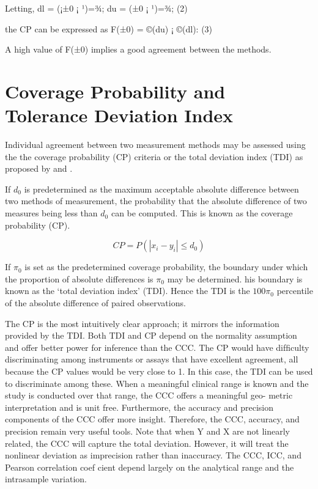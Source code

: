 \documentclass[MAIN.tex]{subfiles}
\begin{document}
Letting,
dl = (¡±0 ¡ ¹)=¾; du = (±0 ¡ ¹)=¾; (2)


the CP can be expressed as
F(±0) = ©(du) ¡ ©(dl): (3)

A high value of F(±0) implies a good agreement between the methods.


\section{Coverage Probability and Tolerance Deviation Index}

Individual agreement between two measurement methods may be
assessed using the the coverage probability (CP) criteria or the
total deviation index (TDI) as proposed by \citet{lin2000} and
\citet{lin2002}.

If $d_{0}$ is predetermined as the maximum acceptable absolute
difference between two methods of measurement, the probability
that the absolute difference of two measures being less than
$d_{0}$ can be computed. This is known as the coverage probability
(CP).

\begin{equation}
CP = P(|x_{i} - y_{i}| \leq d_{0})
\end{equation}

If $\pi_{0}$ is set as the predetermined coverage probability, the
boundary under which the proportion of absolute differences is
$\pi_{0}$ may be determined. his boundary is known as the `total
deviation index' (TDI). Hence the TDI is the $100\pi_{0}$
percentile of the absolute difference of paired observations.


The CP is the most intuitively clear approach; it mirrors the information provided by the TDI. 
Both TDI and CP depend on the normality assumption and offer better power
for inference than the CCC. The CP would have difficulty discriminating among instruments or 
assays that have excellent agreement, all because the CP values would be very close to
1. In this case, the TDI can be used to discriminate among these. When a meaningful clinical range is known and the study is conducted over that range, the CCC offers a meaningful geo- metric interpretation and is unit free. Furthermore, the accuracy and precision components of the CCC offer more insight. Therefore, the CCC, accuracy, and precision remain very useful tools. Note that when Y and X are not linearly related, the CCC will capture the total deviation. However, it will treat the nonlinear deviation as imprecision rather than inaccuracy. The CCC, ICC, and Pearson correlation coef cient depend
largely on the analytical range and the intrasample variation.
\end{document}
